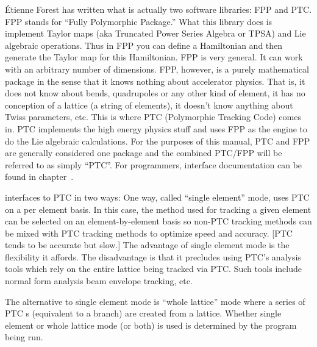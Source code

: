 \'Etienne Forest\cite{b:forest} has written what is actually two
software libraries: FPP and PTC.  FPP stands for ``Fully Polymorphic
Package.'' What this library does is implement Taylor maps (aka
Truncated Power Series Algebra or TPSA) and Lie algebraic
operations. Thus in FPP you can define a Hamiltonian and then generate
the Taylor map for this Hamiltonian. FPP is very general. It can work
with an arbitrary number of dimensions.  FPP, however, is a purely
mathematical package in the sense that it knows nothing about
accelerator physics. That is, it does not know about bends,
quadrupoles or any other kind of element, it has no conception of a
lattice (a string of elements), it doesn't know anything about Twiss
parameters, etc. This is where PTC (Polymorphic Tracking Code) comes
in. PTC implements the high energy physics stuff and uses FPP as
the engine to do the Lie algebraic calculations.  For the purposes of
this manual, PTC and FPP are generally considered one package and the
combined PTC/FPP will be referred to as simply ``PTC''.
For programmers, interface documentation can be found in
chapter~.

\bmad interfaces to PTC in two ways: One way, called ``single
element'' mode, uses PTC on a per element basis. In this case, the
method used for tracking a given element can be selected on an
element-by-element basis so non-PTC tracking methods can be mixed with
PTC tracking methods to optimize speed and accuracy. [PTC tends to be
accurate but slow.] The advantage of single element mode is the
flexibility it affords. The disadvantage is that it precludes using
PTC's analysis tools which rely on the entire lattice being tracked
via PTC. Such tools include normal form analysis beam envelope
tracking, etc.

The alternative to single element mode is ``whole lattice'' mode where
a series of PTC s (equivalent to a \bmad branch) are
created from a \bmad lattice. Whether single element or whole lattice
mode (or both) is used is determined by the program being run.

